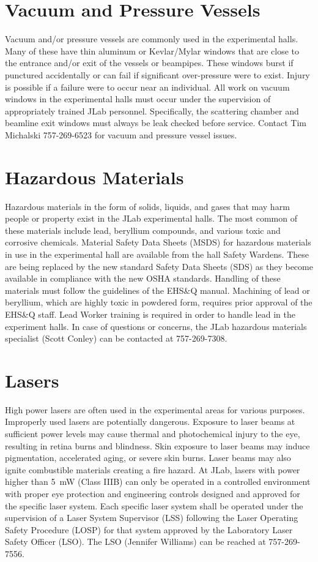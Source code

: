 \documentclass[12pt]{report}
\begin{document}
\section{Vacuum and Pressure Vessels}

Vacuum and/or pressure vessels are commonly used in the experimental halls. Many 
of these have thin aluminum or Kevlar/Mylar windows that are close to the entrance 
and/or exit of the vessels or beampipes. These windows burst if punctured accidentally 
or can fail if significant over-pressure were to exist. Injury is possible if a failure 
were to occur near an individual. All work on vacuum windows in the experimental halls 
must occur under the supervision of appropriately trained JLab personnel. Specifically, 
the scattering chamber and beamline exit windows must always be leak checked before 
service. Contact Tim Michalski 757-269-6523 for vacuum and pressure vessel issues.

\section{Hazardous Materials}

Hazardous materials in the form of solids, liquids, and gases that may harm people or 
property exist in the JLab experimental halls. The most common of these materials 
include lead, beryllium compounds, and various toxic and corrosive chemicals. Material 
Safety Data Sheets (MSDS) for hazardous materials in use in the experimental hall are 
available from the hall Safety Wardens. These are being replaced by the new standard
Safety Data Sheets (SDS) as they become available in compliance with the new OSHA 
standards. Handling of these materials must follow the guidelines of the EHS\&Q manual. 
Machining of lead or beryllium, which are highly toxic in powdered form, requires prior 
approval of the EHS\&Q staff. Lead Worker training is required in order to handle lead in 
the experiment halls. In case of questions or concerns, the JLab hazardous materials 
specialist (Scott Conley) can be contacted at 757-269-7308.

\section{Lasers}

High power lasers are often used in the experimental areas for various purposes. Improperly 
used lasers are potentially dangerous. Exposure to laser beams at sufficient power levels 
may cause thermal and photochemical injury to the eye, resulting in retina burns and 
blindness. Skin exposure to laser beams may induce pigmentation, accelerated aging, or 
severe skin burns. Laser beams may also ignite combustible materials creating a fire hazard. 
At JLab, lasers with power higher than 5~mW (Class IIIB) can only be operated in a controlled 
environment with proper eye protection and engineering controls designed and approved for the 
specific laser system. Each specific laser system shall be operated under the supervision of 
a Laser System Supervisor (LSS) following the Laser Operating Safety Procedure (LOSP) for 
that system approved by the Laboratory Laser Safety Officer (LSO). The LSO (Jennifer Williams) can 
be reached at 757-269-7556.
%
%
\end{document}
